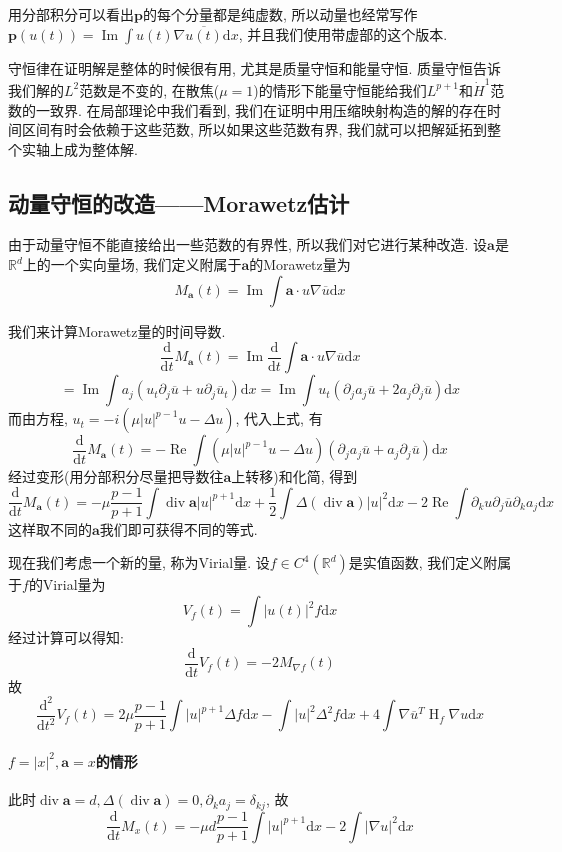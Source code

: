 \documentclass{ctexbook}
\theoremstyle{definition}
\theoremstyle{remark}
\newcommand{\dif}{\mathrm{d}}
\newcommand{\ovl}{\overline}
\begin{document}
用分部积分可以看出$\bm{p}$的每个分量都是纯虚数, 所以动量也经常写作$\bm{p}(u(t))=\operatorname{Im}\int u(t)\nabla\ovl{u(t)}\dif x$, 并且我们使用带虚部的这个版本. 

守恒律在证明解是整体的时候很有用, 尤其是质量守恒和能量守恒. 质量守恒告诉我们解的$L^2$范数是不变的, 在散焦($\mu=1$)的情形下能量守恒能给我们$L^{p+1}$和$\dot{H}^1$范数的一致界. 在局部理论中我们看到, 我们在证明中用压缩映射构造的解的存在时间区间有时会依赖于这些范数, 所以如果这些范数有界, 我们就可以把解延拓到整个实轴上成为整体解. 


\subsection{动量守恒的改造——Morawetz估计}
由于动量守恒不能直接给出一些范数的有界性, 所以我们对它进行某种改造. 设$\bm{a}$是$\mathbb{R}^d$上的一个实向量场, 我们定义附属于$\bm{a}$的Morawetz量为
$$M_{\bm{a}}(t)=\operatorname{Im}\int\bm{a}\cdot u\nabla\overline{u}\dif x$$

我们来计算Morawetz量的时间导数. 
$$\frac{\dif}{\dif t}M_{\bm{a}}(t)=\operatorname{Im}\frac{\dif}{\dif t}\int\bm{a}\cdot u\nabla\overline{u}\dif x$$
$$=\operatorname{Im}\int a_j(u_t\partial_j\overline{u}+u\partial_j\overline{u}_t)\dif x=\operatorname{Im}\int u_t(\partial_ja_j\ovl{u}+2a_j\partial_j\ovl{u})\dif x$$
而由方程, $u_t=-i(\mu|u|^{p-1}u-\Delta u)$, 代入上式, 有
$$\frac{\dif}{\dif t}M_{\bm{a}}(t)=-\operatorname{Re}\int (\mu|u|^{p-1}u-\Delta u)(\partial_ja_j\ovl{u}+a_j\partial_j\ovl{u})\dif x$$
经过变形(用分部积分尽量把导数往$\bm{a}$上转移)和化简, 得到
$$\frac{\dif}{\dif t}M_{\bm{a}}(t)=-\mu\frac{p-1}{p+1}\int\operatorname{div}\bm{a}|u|^{p+1}\dif x+\frac{1}{2}\int\Delta(\operatorname{div}\bm{a})|u|^2\dif x-2\operatorname{Re}\int\partial_ku\partial_j\ovl{u}\partial_ka_j\dif x$$
这样取不同的$\bm{a}$我们即可获得不同的等式. 

现在我们考虑一个新的量, 称为Virial量. 设$f\in C^4(\mathbb{R}^d)$是实值函数, 我们定义附属于$f$的Virial量为
$$V_f(t)=\int |u(t)|^2f\dif x$$
经过计算可以得知:  
$$\frac{\dif}{\dif t}V_f(t)=-2M_{\nabla f}(t)$$
故
$$\frac{\dif^2}{\dif t^2}V_f(t)=2\mu\frac{p-1}{p+1}\int|u|^{p+1}\Delta f\dif x-\int|u|^2\Delta^2f\dif x+4\int\nabla \ovl{u}^T\operatorname{H}_f\nabla u\dif x$$

\paragraph{$f=|x|^2,\bm{a}=x$的情形}此时$\operatorname{div}\bm{a}=d, \Delta(\operatorname{div}\bm{a})=0, \partial_ka_j=\delta_{kj}$, 故
$$\frac{\dif}{\dif t}M_{x}(t)=-\mu d\frac{p-1}{p+1}\int|u|^{p+1}\dif x-2\int|\nabla u|^2\dif x$$
\end{document}
